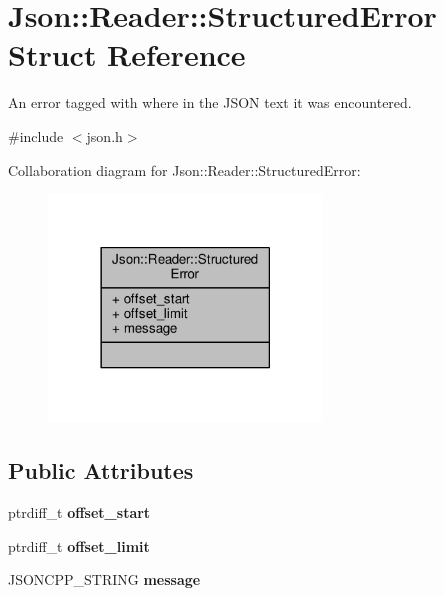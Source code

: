 \hypertarget{structJson_1_1Reader_1_1StructuredError}{}\section{Json\+:\+:Reader\+:\+:Structured\+Error Struct Reference}
\label{structJson_1_1Reader_1_1StructuredError}


An error tagged with where in the J\+S\+ON text it was encountered.  




{\ttfamily \#include $<$json.\+h$>$}



Collaboration diagram for Json\+:\+:Reader\+:\+:Structured\+Error\+:
\nopagebreak
\begin{figure}[H]
\begin{center}
\leavevmode
\includegraphics[width=206pt]{de/d68/structJson_1_1Reader_1_1StructuredError__coll__graph}
\end{center}
\end{figure}
\subsection*{Public Attributes}
\begin{DoxyCompactItemize}
\item 
ptrdiff\+\_\+t {\bfseries offset\+\_\+start}\hypertarget{structJson_1_1Reader_1_1StructuredError_ac98af0da2d704be4b64a9572a682423b}{}\label{structJson_1_1Reader_1_1StructuredError_ac98af0da2d704be4b64a9572a682423b}

\item 
ptrdiff\+\_\+t {\bfseries offset\+\_\+limit}\hypertarget{structJson_1_1Reader_1_1StructuredError_ad76ac01aeb0ada7e882c2df5daa54c6e}{}\label{structJson_1_1Reader_1_1StructuredError_ad76ac01aeb0ada7e882c2df5daa54c6e}

\item 
J\+S\+O\+N\+C\+P\+P\+\_\+\+S\+T\+R\+I\+NG {\bfseries message}\hypertarget{structJson_1_1Reader_1_1StructuredError_a2d2dc387aefe406a71de3daa263a38f4}{}\label{structJson_1_1Reader_1_1StructuredError_a2d2dc387aefe406a71de3daa263a38f4}

\end{DoxyCompactItemize}


